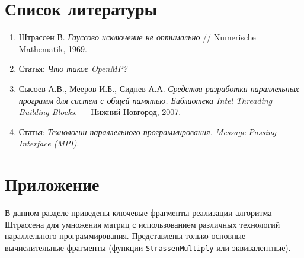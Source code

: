 \documentclass[14pt,a4paper]{extarticle}
\begin{document}
\section{Список литературы}

\begin{enumerate}
    \item Штрассен В. \textit{Гауссово исключение не оптимально} // Numerische Mathematik, 1969.
    \item Статья: \textit{Что такое OpenMP?}
    \item Сысоев А.В., Мееров И.Б., Сиднев А.А. \textit{Средства разработки параллельных программ для систем с общей памятью. Библиотека Intel Threading Building Blocks}. — Нижний Новгород, 2007.
    \item Статья: \textit{Технологии параллельного программирования. Message Passing Interface (MPI)}.
\end{enumerate}

\section{Приложение}

В данном разделе приведены ключевые фрагменты реализации алгоритма Штрассена для умножения матриц с использованием различных технологий параллельного программирования. Представлены только основные вычислительные фрагменты (функции \texttt{StrassenMultiply} или эквивалентные).
\end{document}
